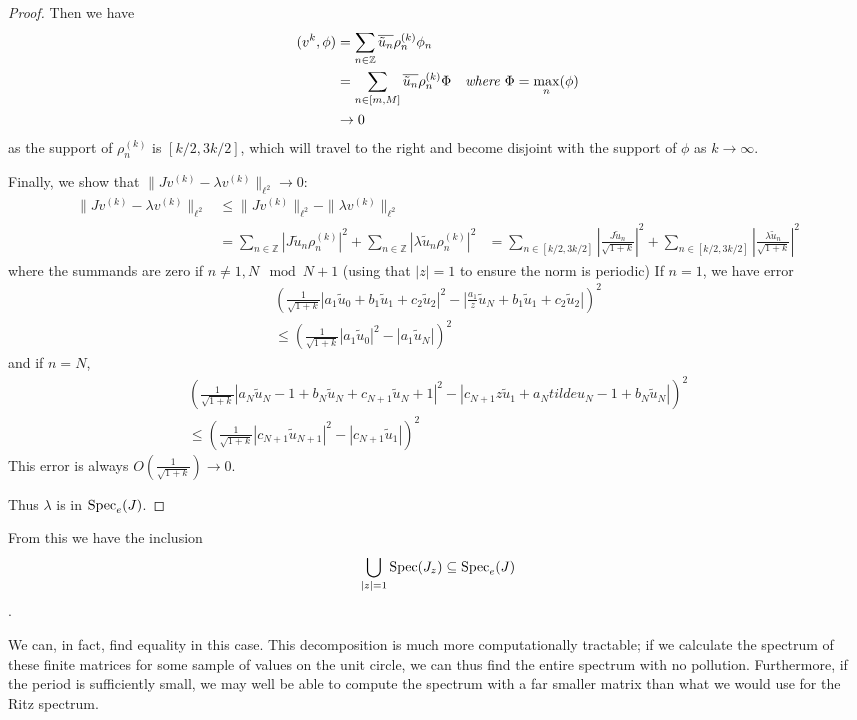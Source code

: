 \documentclass[../main.tex]{subfiles}
\begin{document}
\begin{proof}
Then we have
\begin{align*}
  (v^{k}, \phi) & =  \sum_{n \in \mathbb{Z}}
  \overline{\tilde{u}_n} \rho_n^{(k)} \phi_n & \\
  & = \sum_{n \in [m, M]} \overline{\tilde{u}_n} \rho_n^{(k)} \Phi 
    & \text{\emph{where $\Phi = \max_{n}(\phi)$}} \\
  & \rightarrow 0 & 
\end{align*}
  as the support of $\rho_n^{(k)}$ is $[k/2, 3k/2]$, which will travel to the 
  right and become disjoint with the support of $\phi$ as $k \rightarrow \infty$.

Finally, we show that $\|Jv^{(k)} - \lambda v^{(k)}\|_{\ell^2} \rightarrow 0$:
\begin{align*}
    \|Jv^{(k)} - \lambda v^{(k)}\|_{\ell^2} & \leq \|Jv^{(k)}\|_{\ell^2}  - \|\lambda v^{(k)}\|_{\ell^2}  \\
    & = \sum_{n \in \mathbb{Z}}|J\tilde{u}_n \rho_n^{(k)}|^2 + \sum_{n \in \mathbb{Z}}|\lambda\tilde{u}_n \rho_n^{(k)}|^2
    & = \sum_{n \in [k/2, 3k/2]}|\frac{J\tilde{u}_n}{\sqrt{1+k}}|^2 + \sum_{n \in [k/2, 3k/2]}|\frac{\lambda\tilde{u}_n}{\sqrt{1+k}}|^2
\end{align*}
  where the summands are zero if $n \neq {1, N}\mod N+1$ (using that $|z| = 1$ to ensure the norm is periodic)
  If $n = 1$, we have error
\begin{align*}
  (\frac{1}{\sqrt{1+k}}|a_1 \tilde{u}_0 + b_1 \tilde{u}_1 + c_2 \tilde{u}_2|^2 - |\frac{a_1}{z}\tilde{u}_N + b_1 \tilde{u}_1 + c_2 \tilde{u}_2|)^2 \\
  \leq (\frac{1}{\sqrt{1+k}}|a_1 \tilde{u}_0|^2 - |a_1 \tilde{u}_N|)^2
\end{align*}
  and if $n = N$,
\begin{align*}
  (\frac{1}{\sqrt{1+k}}|a_N \tilde{u}_N-1 + b_N \tilde{u}_N + c_{N+1} \tilde{u}_N+1|^2 - |c_{N+1}z\tilde{u}_1 + a_N tilde{u}_N-1 + b_N \tilde{u}_N|)^2 \\
  \leq (\frac{1}{\sqrt{1+k}}|c_{N+1} \tilde{u}_{N+1}|^2 - |c_{N+1} \tilde{u}_1|)^2
\end{align*}
This error is always $O(\frac{1}{\sqrt{1 + k}}) \rightarrow 0$.

Thus $\lambda$ is in $\mathrm{Spec}_e(J)$. \end{proof} From this we have the inclusion
$$\bigcup_{|z|=1} \mathrm{Spec}(J_z) \subseteq \mathrm{Spec}_e(J)$$.

We can, in fact, find equality in this case. This decomposition is much more
computationally tractable; if we calculate the spectrum of these finite
matrices for some sample of values on the unit circle, we can thus find the
entire spectrum with no pollution. Furthermore, if the period is sufficiently
small, we may well be able to compute the spectrum with a far smaller matrix
than what we would use for the Ritz spectrum.
\end{document}

